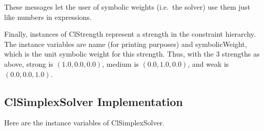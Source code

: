 \documentclass{article}
\begin{document}
These messages let the user of symbolic weights (i.e.\ the solver) use them
just like numbers in expressions.

Finally, instances of {\sf ClStrength} represent a strength in the
constraint hierarchy.  The instance variables are {\sf name} (for printing
purposes) and {\sf symbolicWeight}, which is the unit symbolic weight for
this strength.  Thus, with the 3 strengths as above, {\sf strong} is $(1.0,
0.0, 0.0)$, {\sf medium} is $(0.0, 1.0, 0.0)$, and {\sf weak} is $(0.0,
0.0, 1.0)$.

\subsection{{\sf ClSimplexSolver} Implementation}
\label{cl-simplex-solver-implementation}

Here are the instance variables of {\sf ClSimplexSolver}.  
\end{document}
